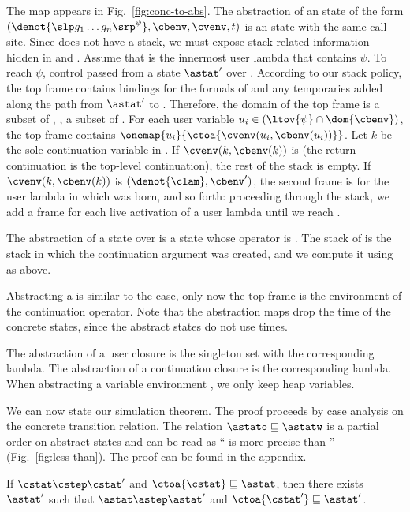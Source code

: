 \documentclass{LMCS}
\theoremstyle{definition} \newtheorem{property}[thm]{Property}
\begin{document}
The map \ctoa{\cdot} appears in Fig.~\ref{fig:conc-to-abs}.
The abstraction of an \deval{} state \cstat{} of the form
$(\denot{\slp g_1 \dots g_n\srp^{\psi}}, \cbenv, \cvenv, t)$
is an \daeval{} state \astat{} with the same call site.
Since \cstat{} does not have a stack, we must expose stack-related information 
hidden in \cbenv{} and \cvenv.
Assume that  is the innermost user lambda that contains $\psi$.
To reach $\psi$, control passed from a \dauapply{} state $\astat'$ 
over .
According to our stack policy, the top frame contains bindings for the 
formals of  and any temporaries added along the path from $\astat'$ 
to \astat.
Therefore, the domain of the top frame is a subset of , \ie{},
a subset of \ltov{\psi}.
For each user variable $u_i \in (\ltov{\psi} \cap \dom{\cbenv})$,
the top frame contains $\onemap{u_i}{\ctoa{\cvenv(u_i, \cbenv(u_i))}}$.
Let $k$ be the sole continuation variable in \ltov{\psi}.
If $\cvenv(k, \cbenv(k))$ is \haltcont{} (the return continuation is the 
top-level continuation), the rest of the stack is empty.
If $\cvenv(k, \cbenv(k))$ is $(\denot{\clam}, \cbenv')$, the second frame is for
the user lambda in which \ilam{\gamma} was born, and so forth:
proceeding through the stack, we add a frame for each live activation of a 
user lambda until we reach \haltcont.

The abstraction of a \duapply{} state over \tuple{\denot{\ulam}, \cbenv} 
is a \dauapply{} state \astat{} whose operator is \denot{\ulam}.
The stack of \astat{} is the stack in which the continuation 
argument was created, and we compute it using \tostackNA{} as above.

Abstracting a \dcapply{} is similar to the \duapply{} case,
only now the top frame is the environment of the continuation operator.
Note that the abstraction maps drop the time of the concrete states,
since the abstract states do not use times.

The abstraction of a user closure is the singleton set with the 
corresponding lambda.
The abstraction of a continuation closure is the corresponding lambda.
When abstracting a variable environment \cvenv, we only keep heap variables.

We can now state our simulation theorem.
The proof proceeds by case analysis on the concrete transition relation.
The relation $\astato \sqsubseteq \astatw$ is a partial order on abstract 
states and can be read as ``\astato{} is more precise than \astatw'' 
(Fig.~\ref{fig:less-than}).
The proof can be found in the appendix.
\begin{thm}[Simulation] 
If $\cstat \cstep \cstat'$ and $\ctoa{\cstat} \sqsubseteq \astat$, then 
there exists $\astat'$ such that $\astat \astep \astat'$
and $\ctoa{\cstat'} \sqsubseteq \astat'$.
\end{thm}
\end{document}
